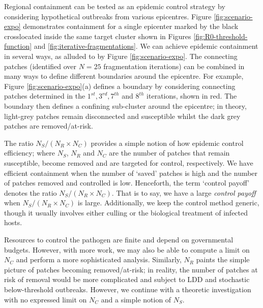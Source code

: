 Regional containment can be tested as an epidemic control strategy by considering hypothetical outbreaks from various epicentres. Figure \ref{fig:scenario-expo} demonstrates containment for a single epicenter marked by the black cross\textemdash located inside the same target cluster shown in Figures \ref{fig:R0-threshold-function} and \ref{fig:iterative-fragmentations}. We can achieve epidemic containment in several ways, as alluded to by Figure \ref{fig:scenario-expo}. The connecting patches (identified over $N=25$ fragmentation iterations) can be combined in many ways to define different boundaries around the epicentre. For example, Figure \ref{fig:scenario-expo}(a) defines a boundary by considering connecting patches determined in the $1^{st}, 3^{rd}, 7^{th}$ and $8^{th}$ iterations, shown in red. The boundary then defines a confining sub-cluster around the epicentre; in theory, light-grey patches remain disconnected and susceptible whilst the dark grey patches are removed/at-risk.

The ratio $N_{S}/(N_{R}\times N_{C})$ provides a simple notion of how epidemic control efficiency; where $N_S$, $N_{R}$ and $N_{C}$ are the number of patches that remain susceptible, become removed and are targeted for control, respectively. We have efficient containment when the number of `saved' patches is high and the number of patches removed and controlled is low. Henceforth, the term `control payoff' denotes the ratio $N_{S}/(N_{R}\times N_{C})$. That is to say, we have a large \textit{control payoff} when $N_{S}/(N_{R}\times N_{C})$ is large. 
Additionally, we keep the control method generic, though it usually involves either culling or the biological treatment of infected hosts.

Resources to control the pathogen are finite and depend on governmental budgets. However, with more work, we may also be able to compute a limit on $N_{C}$ and perform a more sophisticated analysis. Similarly, $N_R$ paints the simple picture of patches becoming removed/at-risk;  in reality, the number of patches at risk of removal would be more complicated and subject to LDD and stochastic below-threshold outbreaks. However, we continue with a theoretic investigation with no expressed limit on $N_{C}$ and a simple notion of $N_S$.

